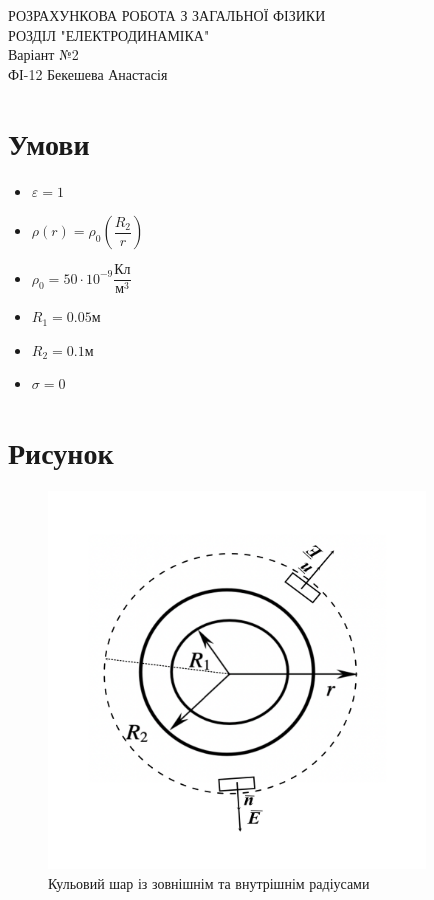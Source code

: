 \documentclass[a4paper,12pt]{article}
\begin{document}
	\begin{justify}
	\thispagestyle{empty}\setlength{\parindent}{0pt}
	\vspace*{\fill}
		\begin{center}
			\LARGE{РОЗРАХУНКОВА РОБОТА З ЗАГАЛЬНОЇ ФІЗИКИ\\РОЗДІЛ "ЕЛЕКТРОДИНАМІКА"\\Варіант №2\\} 
			ФІ-12 Бекешева Анастасія 
		\end{center}
	\vspace*{\fill}\newpage
	\section{Умови}
	\begin{itemize}
		\item $\varepsilon=1$
		\item $\rho(r)=\rho_0\left(\dfrac{R_2}{r}\right)$
		\item $\rho_0=50\cdot10^{-9}\dfrac{\textrm{Кл}}{\textrm{м}^3}$
		\item $R_1=0.05\textrm{м}$
		\item $R_2=0.1\textrm{м}$
		\item $\sigma=0$
	\end{itemize}
	\section{Рисунок}
	\begin{figure}[!h]
    \centering
    \includegraphics[width=10cm]{media/cw_graph1}
    \caption{Кульовий шар із зовнішнім та внутрішнім радіусами}
    \label{fig:1}
	\end{figure}

\end{justify}
\end{document}
